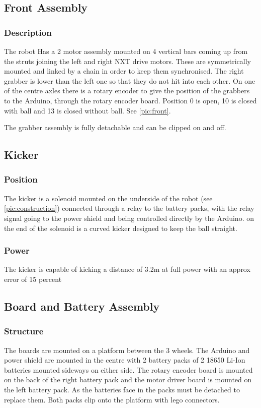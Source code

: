 \subsection{Front Assembly}
\subsubsection{Description}
The robot Has a 2 motor assembly mounted on 4 vertical bars coming up from the struts joining the left and right NXT drive motors. These are symmetrically mounted and linked by a chain in order to keep them synchronised. The right grabber is lower than the left one so that they do not hit into each other. On one of the centre axles there is a rotary encoder to give the position of the grabbers to the Arduino, through the rotary encoder board. Position 0 is open, 10 is closed with ball and 13 is closed without ball. See \autoref{pic:front}.

The grabber assembly is fully detachable and can be clipped on and off. 


\subsection{Kicker}
\subsubsection{Position}
The kicker is a solenoid mounted on the underside of the robot (see \autoref{pic:construction}) connected through a relay to the battery packs, with the relay signal going to the power shield and being controlled directly by the Arduino. on the end of the solenoid is a curved kicker designed to keep the ball straight.

\subsubsection{Power}
The kicker is capable of kicking a distance of 3.2m at full power with an approx error of 15 percent

\subsection{Board and Battery Assembly}
\subsubsection{Structure}
The boards are mounted on a platform between the 3 wheels. The Arduino and power
shield are mounted in the centre with 2 battery packs of 2 18650 Li-Ion batteries mounted sideways on either
side. The rotary encoder board is
mounted on the back of the right battery pack and the motor driver board is mounted
on the left battery pack. As the batteries face in the packs must be detached to
replace them. Both packs clip onto the platform with lego connectors.

